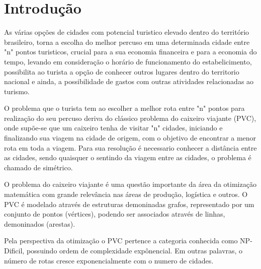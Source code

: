\documentclass[
	12pt,				%
	openright,			%
	twoside,			%
	a4paper,			%
	chapter=TITLE,		%
	section=TITLE,		%
	english,			%
	french,				%
	spanish,			%
	brazil				%
	]{abntex2}
\begin{document}
\tableofcontents*
\cleardoublepage



\textual

\chapter{Introdução}
As várias opções de cidades com potencial turistico elevado dentro do território brasileiro,
torna a escolha do melhor percuso em uma determinada cidade entre "n" pontos turisticos,
crucial para a sua economia financeira e para a economia do tempo, levando em consideração
o horário de funcionamento do estabelicimento, possibilita ao turista a opção de conhecer
outros lugares dentro do territorio nacional e ainda, a possibilidade de gastos
com outras atividades relacionadas ao turismo.

O problema que o turista tem ao escolher a melhor rota entre "n" pontos para realização do seu percuso
deriva do clássico problema do caixeiro viajante (PVC), onde supõe-se que um caixeiro tenha
de visitar "n" cidades, iniciando e finalizando sua viagem na cidade de origem, com o objetivo de encontrar
a menor rota em toda a viagem. Para sua resolução é necessario conhecer a distância entre as cidades, sendo
quaisquer o sentindo da viagem entre as cidades, o problema é chamado de simétrico.

O problema do caixeiro viajante é uma questão importante da área da otimização matemática com grande relevância nas
áreas de produção, logística e outros. O PVC é modelado através de estruturas demoninadas grafos,
representado por um conjunto de pontos (vértices), podendo ser associados através de linhas,
demoninados (arestas).

Pela perspectiva da otimização o PVC pertence a categoria conhecida como NP-Dificil, possuindo ordem de
complexidade expônencial. Em outras palavras, o número de rotas cresce exponencialmente com o numero de cidades.
\end{document}
